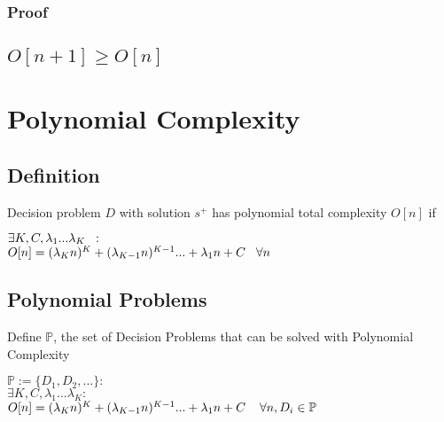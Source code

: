 \documentclass[11pt]{article}
\begin{document}
\subsubsection{Proof}


\subsection{$O[n+1] \geq O[n]$}









\newpage
\section{Polynomial Complexity}

\subsection{Definition}
Decision problem $D$ with solution $s^+$ has polynomial total complexity $O[n]$ if
\begin{center}
$\exists K,C,\lambda_1...\lambda_K \hspace{2mm} :$
\\ \vspace{2mm}
$O[n] = (\lambda_K n)^K + (\lambda_{K-1} n)^{K-1}... + \lambda_1 n + C \hspace{3mm} \forall n$
\end{center}





\subsection{Polynomial Problems}
Define $\mathbb{P}$, the set of Decision Problems that can be solved with Polynomial Complexity
\begin{center}
$
\mathbb{P} := \{D_1,D_2,...\} : 
$
\\
$
\exists K,C,\lambda_1...\lambda_K : 
$
\\
$
O[n] = (\lambda_K n)^K + (\lambda_{K-1} n)^{K-1}... + \lambda_1 n + C \hspace{4mm} \forall n, D_i \in \mathbb{P}
$
\end{center}
\end{document}
